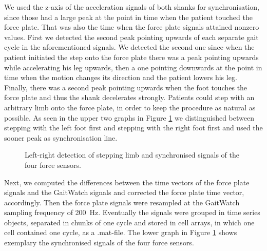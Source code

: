 We used the z-axis of the acceleration signals of both shanks for synchronisation, since those had a large peak at the point in time when the patient touched the force plate. That was also the time when the force plate signals attained nonzero values.  First we detected the second peak pointing upwards of each separate gait cycle in the aforementioned signals. We detected the second one since when the patient initiated the step onto the force plate there was a peak pointing upwards while accelerating his leg upwards, then a one pointing downwards at the point in time when the motion changes its direction and the patient lowers his leg. Finally, there was a second peak pointing upwards when the foot touches the force plate and thus the shank decelerates strongly. Patients could step with an arbitrary limb onto the force plate, in order to keep the procedure as natural as possible. As seen in the upper two graphs in Figure \ref{fig:left_right_detect} we distinguished between stepping with the left foot first and stepping with the right foot first and used the sooner peak as synchronisation line. 
\begin{figure}
	\centering
	\caption{Left-right detection of stepping limb and synchronised signals of the four force sensors.}
	\label{fig:left_right_detect}
\end{figure}

  Next, we computed the differences between the time vectors of the force plate signals and the GaitWatch signals and corrected the force plate time vector, accordingly. Then the force plate signals were resampled at the GaitWatch sampling frequency of \mbox{200 Hz}. Eventually the signals were grouped in time series objects, separated in chunks of one cycle and stored in cell arrays, in which one cell contained one cycle, as a .mat-file. The lower graph in Figure \ref{fig:left_right_detect} shows exemplary the synchronised signals of the four force sensors. 

